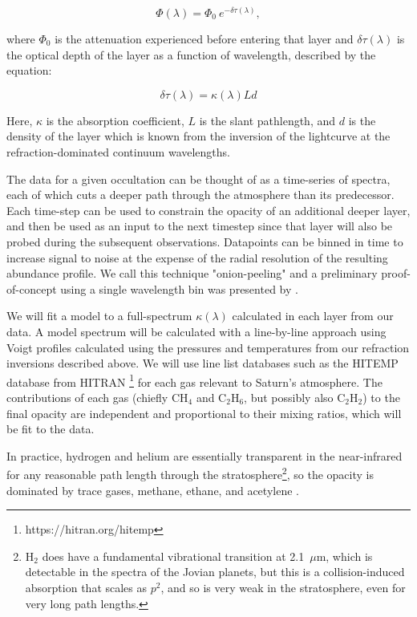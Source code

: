 \documentclass[preprint]{aastex}
\newcommand{\microns}{$\mu$m}     %
\newcommand{\beq}{\begin{equation}}
\newcommand{\eeq}{\end{equation}}
\begin{document}
\begin{multicols}{2}
\beq
\Phi(\lambda) = \Phi_0\ e^{-\delta\tau(\lambda)},
\label{eq:abs_flux}
\eeq

\noindent where $\Phi_0$ is the attenuation experienced before entering that layer
and $\delta\tau(\lambda)$ is the optical depth of the layer as a function of
wavelength, described by the equation:

\beq
\delta\tau(\lambda) = \kappa(\lambda) L d
\label{eq:optical_depth}
\eeq

\noindent Here, $\kappa$ is the absorption coefficient, $L$ is the slant
pathlength, and $d$ is the density of the layer which is known from the
inversion of the lightcurve at the refraction-dominated continuum wavelengths.

The data for a given occultation can be thought of as a time-series of spectra,
each of which cuts a deeper path through the atmosphere than its predecessor.
Each time-step can be used to constrain the opacity of an additional deeper
layer, and then be used as an input to the next timestep since that layer will
also be probed during the subsequent observations. Datapoints can be binned in
time to increase signal to noise at the expense of the radial resolution of the
resulting abundance profile. We call this technique "onion-peeling" and a
preliminary proof-of-concept using a single wavelength bin was presented by
\cite{Banfield11}. 

We will fit a model to a full-spectrum $\kappa(\lambda)$ calculated in each
layer from our data. A model spectrum will be calculated with a line-by-line
approach using Voigt profiles calculated using the pressures and temperatures
from our refraction inversions described above.  We will use line list
databases such as the HITEMP database from HITRAN
\footnote{https://hitran.org/hitemp} \citep{Gordon17b} for each gas relevant to
Saturn's atmosphere. The contributions of each gas (chiefly CH$_4$ and
C$_2$H$_6$, but possibly also C$_2$H$_2$) to the final opacity are independent
and proportional to their mixing ratios, which will be fit to the data.

In practice, hydrogen and helium are essentially transparent in the
near-infrared for any reasonable path length through the
stratosphere\footnote{H$_2$ does have a fundamental vibrational transition at
2.1~\microns, which is detectable in the spectra of the Jovian planets, but
this is a collision-induced absorption that scales as  $p^2$, and so is very
weak in the stratosphere, even for very long path lengths.}, so the opacity is
dominated by trace gases, methane, ethane, and acetylene \citep{Moses05}.


\end{multicols}
\end{document}
